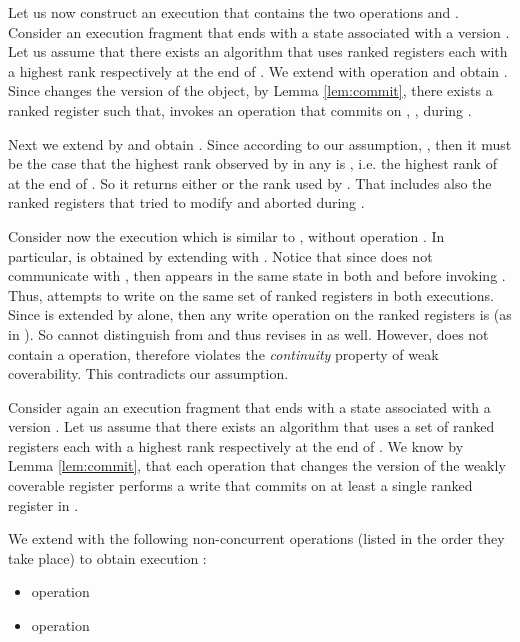 Let us now construct an execution that contains the two operations  and .
Consider an execution fragment  that ends with a state associated with a version . 
Let us assume that there exists an algorithm  that uses  ranked registers 
each with a highest rank  respectively at the end of . 
We extend  with operation  and obtain . Since  
changes the version of the object, by Lemma \ref{lem:commit},
there exists a ranked register  such that,  invokes an operation that commits on , 
, during . 

Next we extend  by  and obtain . 
Since according to our assumption, , then it 
must be the case that the highest rank observed by  in any
 is , i.e. the highest rank of  at the end of .
So it returns either  or  the rank used by .
That includes also the ranked registers that   tried to modify and 
aborted during . 



Consider now the execution  which is similar to ,
without operation . In particular,  is obtained 
by extending  with . Notice that since 
does not communicate with , then  appears in the 
same state in both  and  before invoking . 
Thus,  attempts to write on  
the same set of ranked registers  in both executions. 
Since  is extended by  alone, then any write operation 
on the ranked registers  is  (as in ). 
So  cannot distinguish  
from  and thus revises  in  as well. 
However,  does not contain a  operation, therefore  violates the \emph{continuity}
property of weak coverability. 
This contradicts our assumption. 
\hfill\vspace{1em}





	Consider again an execution fragment  that ends with a state associated with a version . 
	Let us assume that there exists an algorithm  that uses a set  of ranked registers 
	each with a highest rank  respectively at the end of . 
	We know by Lemma \ref{lem:commit}, that each operation  that changes 
	the version of the weakly coverable register performs a write 
	that commits on at least a single ranked register in . 


We extend  with the following non-concurrent operations (listed in the order they take place) 
	to obtain execution :
	\begin{itemize}
		\item operation 
		\item operation 
\end{itemize}

